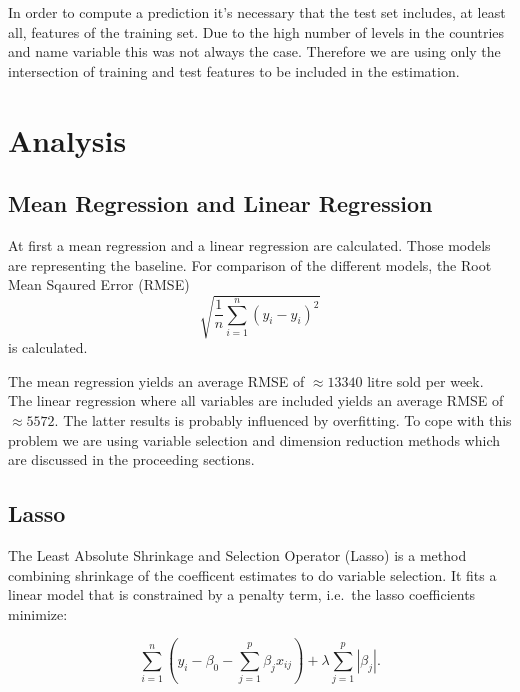 \documentclass[11pt,]{article}
\begin{document}
In order to compute a prediction it's necessary that the test set
includes, at least all, features of the training set. Due to the high
number of levels in the countries and name variable this was not always
the case. Therefore we are using only the intersection of training and
test features to be included in the estimation.

\hypertarget{analysis}{%
\section{Analysis}\label{analysis}}

\hypertarget{mean-regression-and-linear-regression}{%
\subsection{Mean Regression and Linear
Regression}\label{mean-regression-and-linear-regression}}

At first a mean regression and a linear regression are calculated. Those
models are representing the baseline. For comparison of the different
models, the Root Mean Sqaured Error (RMSE)
\[\sqrt{\frac{1}{n}\sum_{i = 1}^{n}\left(y_i-\hat{y}_i\right)^2}\] is
calculated.

The mean regression yields an average RMSE of \(\approx 13340\) litre
sold per week. The linear regression where all variables are included
yields an average RMSE of \(\approx 5572\). The latter results is
probably influenced by overfitting. To cope with this problem we are
using variable selection and dimension reduction methods which are
discussed in the proceeding sections.

\hypertarget{lasso}{%
\subsection{Lasso}\label{lasso}}

The Least Absolute Shrinkage and Selection Operator (Lasso) is a method
combining shrinkage of the coefficent estimates to do variable
selection. It fits a linear model that is constrained by a penalty term,
i.e.~the lasso coefficients minimize:

\[
\sum_{i=1}^{n}(y_i - \beta_0 - \sum_{j=1}^{p}\beta_jx_{ij})+\lambda\sum_{j=1}^{p}|\beta_j|.
\]
\end{document}
